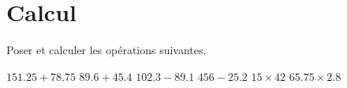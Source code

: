\section{Calcul}

Poser et calculer les opérations suivantes.

\begin{questions}
	\begin{multicols}{2}
		\question $\num{151.25} + \num{78.75}$
		\question $\num{89.6} + \num{45.4}$
		\question $\num{102.3} - \num{89.1}$
		\question $\num{456} - \num{25.2}$
		\question $\num{15} \times \num{42}$
		\question $\num{65.75} \times \num{2.8}$	
	\end{multicols}
	
\end{questions}